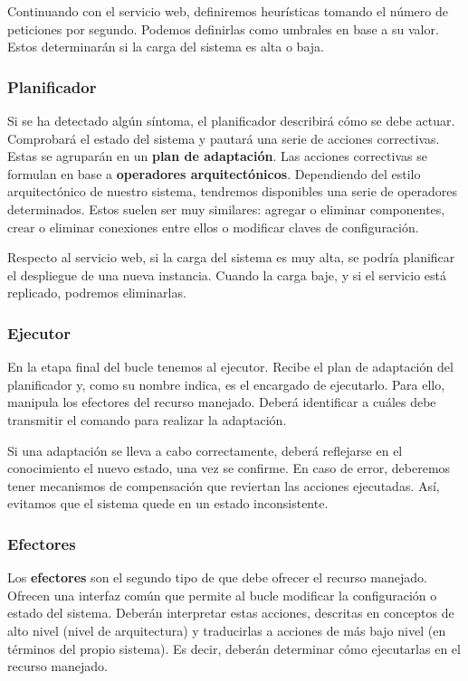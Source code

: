 Continuando con el servicio web, definiremos heurísticas tomando el número de peticiones por segundo. Podemos definirlas como umbrales en base a su valor. Estos determinarán si la carga del sistema es alta o baja.

\subsubsection{Planificador}

Si se ha detectado algún síntoma, el planificador describirá cómo se debe actuar. Comprobará el estado del sistema y pautará una serie de acciones correctivas. Estas se agruparán en un \textbf{plan de adaptación}. Las acciones correctivas se formulan en base a \textbf{operadores arquitectónicos}. \cite{garlanIncreasingSystemDependability2003} Dependiendo del estilo arquitectónico de nuestro sistema, tendremos disponibles una serie de operadores determinados. Estos suelen ser muy similares: agregar o eliminar componentes, crear o eliminar conexiones entre ellos o modificar claves de configuración.

Respecto al servicio web, si la carga del sistema es muy alta, se podría planificar
el despliegue de una nueva instancia. Cuando la carga baje, y si el servicio está replicado, podremos eliminarlas.

\subsubsection{Ejecutor}

En la etapa final del bucle tenemos al ejecutor. Recibe el plan de adaptación del planificador y, como su nombre indica, es el encargado de ejecutarlo. Para ello, manipula los efectores del recurso manejado. Deberá identificar a cuáles debe transmitir el comando para realizar la adaptación.

Si una adaptación se lleva a cabo correctamente, deberá reflejarse en el conocimiento el nuevo estado, una vez se confirme. En caso de error, deberemos tener mecanismos de compensación que reviertan las acciones ejecutadas. Así, evitamos que el sistema quede en un estado inconsistente.

\subsubsection{Efectores}

Los \textbf{efectores} son el segundo tipo de  que debe ofrecer el recurso manejado. Ofrecen una interfaz común que permite al bucle modificar la configuración o estado del sistema. Deberán interpretar estas acciones, descritas en conceptos de alto nivel (nivel de arquitectura) y traducirlas a acciones de más bajo nivel (en términos del propio sistema). \cite{garlanIncreasingSystemDependability2003} Es decir, deberán determinar cómo ejecutarlas en el recurso manejado.

